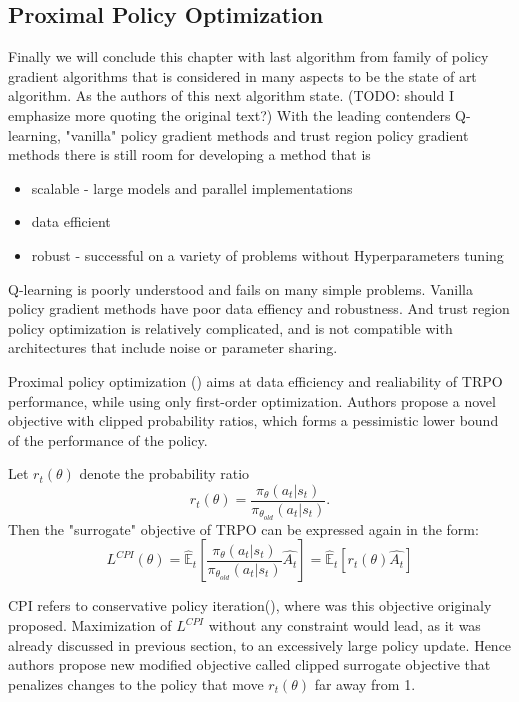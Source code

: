 \subsection{Proximal Policy Optimization}\label{PPO}
Finally we will conclude this chapter with last algorithm from family of policy gradient algorithms that is considered in many aspects to be the state of art algorithm.
As the authors of this next algorithm state. (TODO: should I emphasize more quoting the original text?)
With the leading contenders Q-learning, "vanilla" policy gradient methods and trust region policy gradient methods there is still room for developing a method that is 
\begin{itemize}{}{}
  \item scalable - large models and parallel implementations
  \item data efficient
  \item robust - successful on a variety of problems without Hyperparameters tuning
\end{itemize}

Q-learning is poorly understood and fails on many simple problems.
Vanilla policy gradient methods have poor data effiency and robustness.
And trust region policy optimization is relatively complicated, and is not compatible with architectures that include noise or parameter sharing.

Proximal policy optimization (\cite{PPO}) aims at data efficiency and realiability of TRPO performance, while using only first-order optimization.
Authors propose a novel objective with clipped probability ratios, which forms a pessimistic lower bound of the performance of the policy.

Let $r_t(\theta)$ denote the probability ratio 
\[
  r_t(\theta) = \frac{\pi_\theta(a_t|s_t)}{\pi_{\theta_{old}}(a_t|s_t)}.
\]
Then the "surrogate" objective of TRPO can be expressed again in the form:
\[
  L^{CPI}(\theta)=\hat{\mathbb{E}}_t \left[ \frac{\pi_\theta(a_t|s_t)}{\pi_{\theta_{old}}(a_t|s_t)}\hat{A_t} \right] = \hat{\mathbb{E}}_t \left[ r_t(\theta) \hat{A_t}\right]   
\]

CPI refers to conservative policy iteration(\cite{CPI}), where was this objective originaly proposed.
Maximization of $L^{CPI}$ without any constraint would lead, as it was already discussed in previous section, to an excessively large policy update.
Hence authors propose new modified objective called clipped surrogate objective that penalizes changes to the policy that move $r_t(\theta)$ far away from 1.

